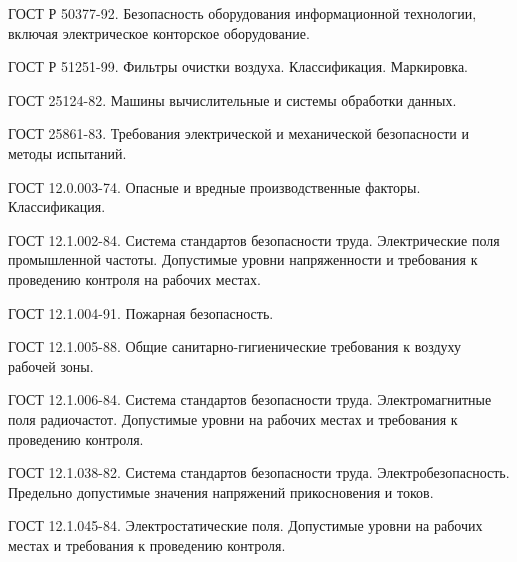  ГОСТ Р 50377-92.
                                Безопасность оборудования информационной
                                технологии, включая электрическое конторское
                                оборудование.

 ГОСТ Р 51251-99.
                                Фильтры очистки воздуха. Классификация.
                                Маркировка.

 ГОСТ 25124-82.
                                Машины вычислительные и системы обработки данных.

 ГОСТ 25861-83.
                                Требования электрической и механической
                                безопасности и методы испытаний.

   ГОСТ 12.0.003-74.
                                Опасные и вредные производственные факторы.
                                Классификация.

   ГОСТ 12.1.002-84.
                                Система стандартов безопасности труда.
                                Электрические поля промышленной частоты.
                                Допустимые уровни напряженности и требования
                                к проведению контроля на рабочих местах.

   ГОСТ 12.1.004-91.
                                Пожарная безопасность.

   ГОСТ 12.1.005-88.
                                Общие санитарно-гигиенические требования
                                к воздуху рабочей зоны.

   ГОСТ 12.1.006-84.
                                Система стандартов безопасности труда.
                                Электромагнитные поля радиочастот.
                                Допустимые уровни на рабочих местах и требования
                                к проведению контроля.

   ГОСТ 12.1.038-82.
                                Система стандартов безопасности труда.
                                Электробезопасность. Предельно допустимые
                                значения напряжений прикосновения и токов.

   ГОСТ 12.1.045-84.
                                Электростатические поля. Допустимые уровни на
                                рабочих местах и требования к проведению контроля.

